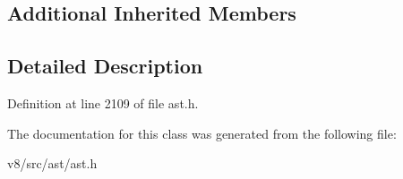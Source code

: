 \subsection*{Additional Inherited Members}


\subsection{Detailed Description}


Definition at line 2109 of file ast.\+h.



The documentation for this class was generated from the following file\+:\begin{DoxyCompactItemize}
\item 
v8/src/ast/ast.\+h\end{DoxyCompactItemize}

